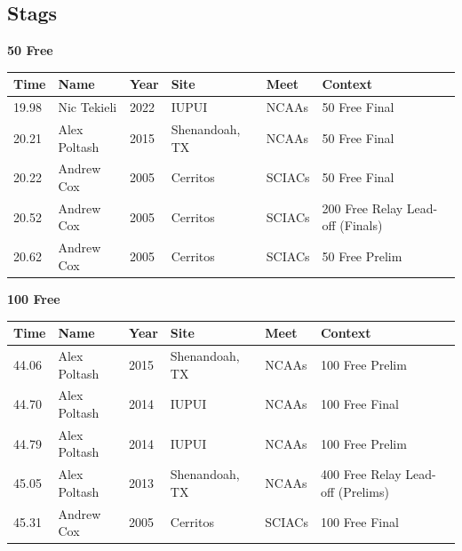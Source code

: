 \subsection{Stags}
\vspace{1.2em}
\noindent\begin{minipage}[t]{0.98\textwidth}
\centering
\textbf{\textcolor{teamprimary}{50 Free}}\par
\vspace{0.5em}
\centering
\small
\renewcommand{\arraystretch}{1.0}
\setlength{\tabcolsep}{4pt}
\begin{tabular}{@{}p{2.0cm}p{3.2cm}p{1.2cm}p{2.0cm}p{2.0cm}p{2.5cm}@{}}
\toprule
\textbf{Time} & \textbf{Name} & \textbf{Year} & \textbf{Site} & \textbf{Meet} & \textbf{Context} \\
\midrule
19.98 & Nic Tekieli & 2022 & IUPUI & NCAAs & 50 Free Final \\
20.21 & Alex Poltash & 2015 & Shenandoah, TX & NCAAs & 50 Free Final \\
20.22 & Andrew Cox & 2005 & Cerritos & SCIACs & 50 Free Final \\
20.52 & Andrew Cox & 2005 & Cerritos & SCIACs & 200 Free Relay Lead-off (Finals) \\
20.62 & Andrew Cox & 2005 & Cerritos & SCIACs & 50 Free Prelim \\
\bottomrule
\end{tabular}
\end{minipage}
\vspace{1.2em}
\noindent\begin{minipage}[t]{0.98\textwidth}
\centering
\textbf{\textcolor{teamprimary}{100 Free}}\par
\vspace{0.5em}
\centering
\small
\renewcommand{\arraystretch}{1.0}
\setlength{\tabcolsep}{4pt}
\begin{tabular}{@{}p{2.0cm}p{3.2cm}p{1.2cm}p{2.0cm}p{2.0cm}p{2.5cm}@{}}
\toprule
\textbf{Time} & \textbf{Name} & \textbf{Year} & \textbf{Site} & \textbf{Meet} & \textbf{Context} \\
\midrule
44.06 & Alex Poltash & 2015 & Shenandoah, TX & NCAAs & 100 Free Prelim \\
44.70 & Alex Poltash & 2014 & IUPUI & NCAAs & 100 Free Final \\
44.79 & Alex Poltash & 2014 & IUPUI & NCAAs & 100 Free Prelim \\
45.05 & Alex Poltash & 2013 & Shenandoah, TX & NCAAs & 400 Free Relay Lead-off (Prelims) \\
45.31 & Andrew Cox & 2005 & Cerritos & SCIACs & 100 Free Final \\
\bottomrule
\end{tabular}
\end{minipage}
